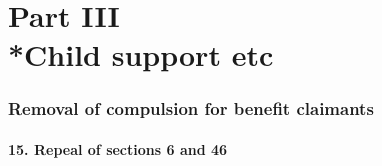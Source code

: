\documentclass[a4paper]{article}
\newcommand{\parthead}{}
\begin{document}
%
%
%
%
%
%
%
%
%

\part[Part III --- Child support etc]{Part III\\*Child support etc}

\renewcommand\parthead{--- Part III}

\section{Removal of compulsion for benefit claimants}

\subsection{15. Repeal of sections 6 and 46}
\end{document}
